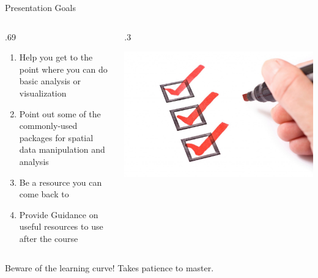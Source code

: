 \documentclass[10pt,ignorenonframetext,]{beamer}
\providecommand{\tightlist}{%
  \setlength{\itemsep}{0pt}\setlength{\parskip}{0pt}}
\def\begincols{\begin{columns}}
\def\begincol{\begin{column}}
\def\endcol{\end{column}}
\def\endcols{\end{columns}}
\begin{document}
\begin{frame}{Presentation Goals}

\begincols
\begincol{.69\textwidth}

\begin{enumerate}
\def\labelenumi{\arabic{enumi}.}
\tightlist
\item
  Help you get to the point where you can do basic analysis or
  visualization
\item
  Point out some of the commonly-used packages for spatial data
  manipulation and analysis
\item
  Be a resource you can come back to
\item
  Provide Guidance on useful resources to use after the course
\end{enumerate}

\endcol
\begincol{.3\textwidth}

\begin{center}\includegraphics[width=1\linewidth]{../images/Goals} \end{center}

\endcol
\endcols

\begin{alertblock}{Beware of the learning curve!}
Takes patience to master.
\end{alertblock}

\end{frame}
\end{document}
